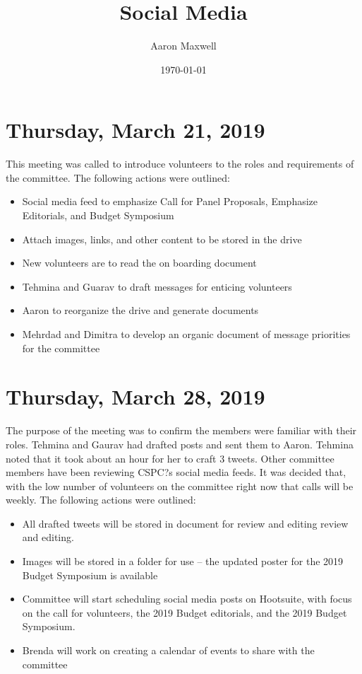 \documentclass[12pt]{amsart}
\title{Social Media}
\author{Aaron Maxwell}
\date{\today}
\begin{document}
\maketitle
\tableofcontents
\section{Thursday, March 21, 2019}\label{mtg01}%
This meeting was called to introduce volunteers to the roles and requirements of the committee.
The following actions were outlined:
\begin{itemize}
\item Social media feed to emphasize Call for Panel Proposals, Emphasize Editorials, and Budget Symposium
\item Attach images, links, and other content to be stored in the drive
\item New volunteers are to read the on boarding document
\item Tehmina and Guarav to draft messages for enticing volunteers
\item Aaron to reorganize the drive and generate documents
\item Mehrdad and Dimitra to develop an organic document of message priorities for the committee
\end{itemize}
\section{Thursday, March 28, 2019}\label{mgt02}%
The purpose of the meeting was to confirm the members were familiar with their roles.
Tehmina and Gaurav had drafted posts and sent them to Aaron.  Tehmina noted that it took about an hour for her to craft 3 tweets.
Other committee members have been reviewing CSPC?s social media feeds.
It was decided that, with the low number of volunteers on the committee right now that calls will be weekly.
The following actions were outlined:
\begin{itemize}
\item All drafted tweets will be stored in document for review and editing review and editing.
\item Images will be stored in a folder for use -- the updated poster for the 2019 Budget Symposium is available
\item Committee will start scheduling social media posts on Hootsuite, with focus on the call for volunteers, the 2019 Budget editorials, and the 2019 Budget Symposium.
\item Brenda will work on creating a calendar of events to share with the committee
\end{itemize}
\end{document}
